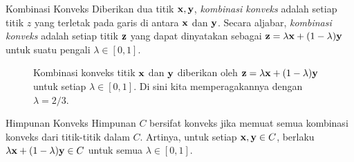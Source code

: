 \begin{definition}{Kombinasi Konveks}
Diberikan dua titik $\mathbf{x},\mathbf{y}$, \emph{kombinasi konveks} adalah setiap titik $z$ yang terletak pada garis di antara $\mathbf{x}$ dan $\mathbf{y}$. Secara aljabar, \emph{kombinasi konveks} adalah setiap titik $\mathbf{z}$ yang dapat dinyatakan sebagai $\mathbf{z} = \lambda \mathbf{x} + (1-\lambda) \mathbf{y} $ untuk suatu pengali $\lambda \in [0,1]$.
\end{definition}

\begin{figure}[h]
\begin{center}
\end{center}
\caption{Kombinasi konveks titik $\mathbf{x}$ dan $\mathbf{y}$ diberikan oleh $\mathbf{z} = \lambda \mathbf{x} + (1-\lambda)\mathbf{y}$ untuk setiap $\lambda \in [0,1]$. Di sini kita memperagakannya dengan $\lambda = 2/3$.}
\end{figure}

\begin{definition}{Himpunan Konveks}
Himpunan $C$ bersifat konveks jika memuat semua kombinasi konveks dari titik-titik dalam $C$. Artinya, untuk setiap $\mathbf{x},\mathbf{y} \in C$, berlaku $ \lambda \mathbf{x} + (1-\lambda) \mathbf{y} \in C$ untuk semua $\lambda \in [0,1]$.
\end{definition}

